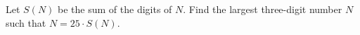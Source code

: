 Let $S(N)$ be the sum of the digits of $N$. Find the largest three-digit number $N$ such that $N=25 \cdot S(N)$.
